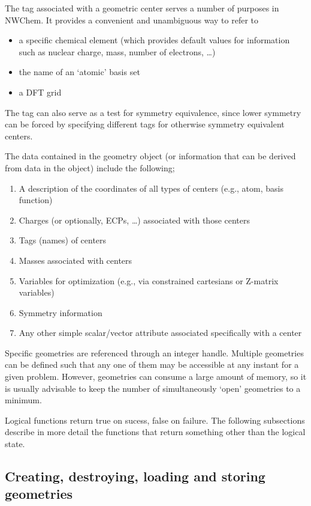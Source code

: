 The tag associated with a geometric center serves a number of purposes in NWChem.
It provides a convenient and unambiguous way to refer to
\begin{itemize}
\item a specific chemical element (which provides default values for information
such as nuclear charge,
  mass, number of electrons, \ldots)
\item the name of an `atomic' basis set
\item a DFT grid
\end{itemize}

The tag can also serve as a test for symmetry equivalence, since lower symmetry 
can be forced
by specifying different tags for otherwise symmetry equivalent
centers.

The data contained in the geometry object (or information that can be derived from
data in the object) include the following;
\begin{enumerate}
\item A description of the coordinates of all types of centers (e.g.,
      atom, basis function)
\item Charges (or optionally, ECPs, \ldots) associated with those centers
\item Tags (names) of centers
\item Masses associated with centers
\item Variables for optimization (e.g., via constrained cartesians
      or Z-matrix variables)
\item Symmetry information
\item Any other simple scalar/vector attribute associated
      specifically with a center
\end{enumerate}

Specific geometries are referenced through an integer handle.   
Multiple geometries can be defined such that any one of them 
may be accessible at any instant for a given problem.  However,
geometries can consume a large amount of memory, so it is usually
advisable to keep the number of simultaneously
`open' geometries to a minimum.

Logical functions return true on sucess, false on failure.  The following
subsections describe in more detail the functions that return something 
other than the
logical state.

\subsection{Creating, destroying, loading and storing geometries}

